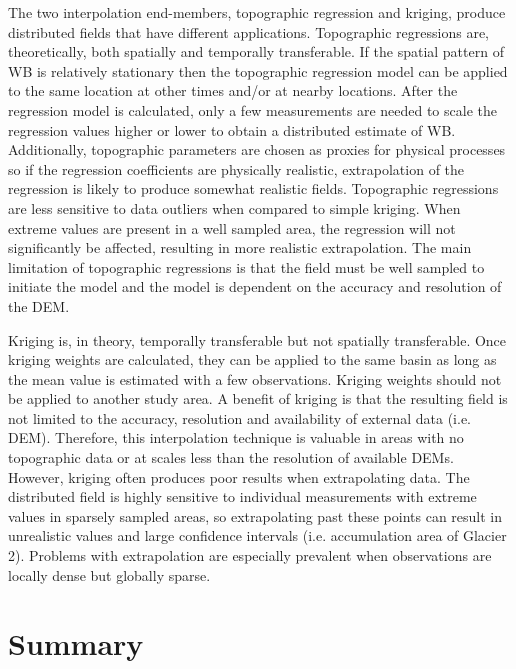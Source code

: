 \documentclass{sfuthesis}
\begin{document}
The two interpolation end-members, topographic regression and kriging, produce distributed fields that have different applications. Topographic regressions are, theoretically, both spatially and temporally transferable. If the spatial pattern of WB is relatively stationary then the topographic regression model can be applied to the same location at other times and/or at nearby locations. After the regression model is calculated, only a few measurements are needed to scale the regression values higher or lower to obtain a distributed estimate of WB. Additionally, topographic parameters are chosen as proxies for physical processes so if the regression coefficients are physically realistic, extrapolation of the regression is likely to produce somewhat realistic fields. Topographic regressions are less sensitive to data outliers when compared to simple kriging. When extreme values are present in a well sampled area, the regression will not significantly be affected, resulting in more realistic extrapolation. The main limitation of topographic regressions is that the field must be well sampled to initiate the model and the model is dependent on the accuracy and resolution of the DEM. 

Kriging is, in theory, temporally transferable but not spatially transferable. Once kriging weights are calculated, they can be applied to the same basin as long as the mean value is estimated with a few observations. Kriging weights should not be applied to another study area. A benefit of kriging is that the resulting field is not limited to the accuracy, resolution and availability of external data (i.e. DEM). Therefore, this interpolation technique is valuable in areas with no topographic data or at scales less than the resolution of available DEMs. However, kriging often produces poor results when extrapolating data. The distributed field is highly sensitive to individual measurements with extreme values in sparsely sampled areas, so extrapolating past these points can result in unrealistic values and large confidence intervals (i.e. accumulation area of Glacier 2). Problems with extrapolation are especially prevalent when observations are locally dense but globally sparse.



\section{Summary}
\end{document}
